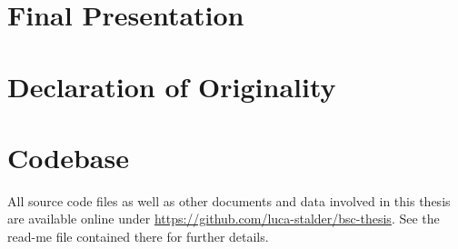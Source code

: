 \documentclass[a4paper,oneside]{csthesis}
\begin{document}
\begin{appendices}
\chapter{Final Presentation}
\chapter{Declaration of Originality}
\chapter{Codebase}
All source code files as well as other documents and data involved in this thesis are available online under \url{https://github.com/luca-stalder/bsc-thesis}. See the read-me file contained there for further details.
\end{appendices}
\end{document}
